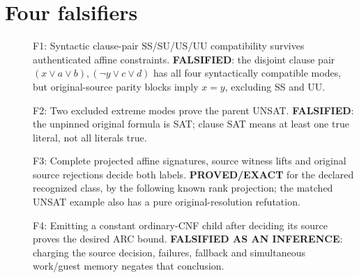 \documentclass[11pt]{article}
\begin{document}
\section{Four falsifiers}
\begin{description}
\item[] F1: Syntactic clause-pair SS/SU/US/UU compatibility survives authenticated affine constraints. \textbf{FALSIFIED}: the disjoint clause pair $(x\vee a\vee b),(\neg y\vee c\vee d)$ has all four syntactically compatible modes, but original-source parity blocks imply $x=y$, excluding SS and UU.
\item[] F2: Two excluded extreme modes prove the parent UNSAT. \textbf{FALSIFIED}: the unpinned original formula is SAT; clause SAT means at least one true literal, not all literals true.
\item[] F3: Complete projected affine signatures, source witness lifts and original source rejections decide both labels. \textbf{PROVED/EXACT} for the declared recognized class, by the following known rank projection; the matched UNSAT example also has a pure original-resolution refutation.
\item[] F4: Emitting a constant ordinary-CNF child after deciding its source proves the desired ARC bound. \textbf{FALSIFIED AS AN INFERENCE}: charging the source decision, failures, fallback and simultaneous work/guest memory negates that conclusion.
\end{description}
\end{document}
